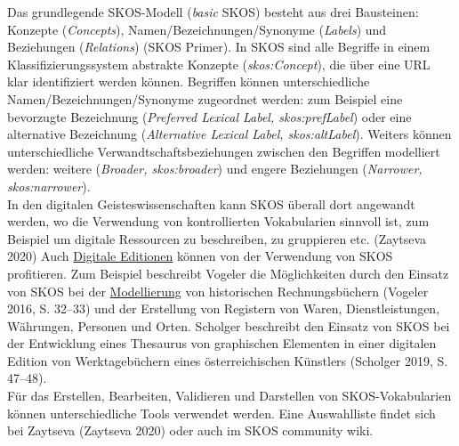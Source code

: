 \documentclass{article}
\begin{document}
        Das grundlegende SKOS-Modell (\emph{basic} SKOS) besteht aus drei
                  Bausteinen: Konzepte (\emph{Concepts}),
                  Namen/Bezeichnungen/Synonyme (\emph{Labels}) und Beziehungen (\emph{Relations}) (SKOS Primer). In SKOS sind alle
                  Begriffe in einem Klassifizierungssystem abstrakte Konzepte (\emph{skos:Concept}), die über eine URL klar identifiziert werden können.
                  Begriffen können unterschiedliche Namen/Bezeichnungen/Synonyme zugeordnet werden:
                  zum Beispiel eine bevorzugte Bezeichnung (\emph{Preferred Lexical
                     Label, skos:prefLabel}) oder eine alternative Bezeichnung (\emph{Alternative Lexical Label, skos:altLabel}). Weiters können
                  unterschiedliche Verwandtschaftsbeziehungen zwischen den Begriffen modelliert
                  werden: weitere (\emph{Broader, skos:broader}) und engere
                  Beziehungen (\emph{Narrower, skos:narrower}). \\
            
        In den digitalen Geisteswissenschaften kann SKOS überall dort angewandt werden, wo
                  die Verwendung von kontrollierten Vokabularien sinnvoll ist, zum Beispiel um
                  digitale Ressourcen zu beschreiben, zu gruppieren etc. (Zaytseva
                     2020) Auch \href{http://gams.uni-graz.at/o:konde.59}{Digitale
                     Editionen} können von der Verwendung von SKOS profitieren. Zum Beispiel
                  beschreibt Vogeler die Möglichkeiten durch den Einsatz von SKOS bei der \href{http://gams.uni-graz.at/o:konde.137}{Modellierung} von historischen
                  Rechnungsbüchern (Vogeler 2016, S. 32–33) und der Erstellung von
                  Registern von Waren, Dienstleistungen, Währungen, Personen und Orten. Scholger
                  beschreibt den Einsatz von SKOS bei der Entwicklung eines Thesaurus von
                  graphischen Elementen in einer digitalen Edition von Werktagebüchern eines
                  österreichischen Künstlers (Scholger 2019, S. 47–48). \\
            
        Für das Erstellen, Bearbeiten, Validieren und Darstellen von SKOS-Vokabularien
                  können unterschiedliche Tools verwendet werden. Eine Auswahlliste findet sich bei Zaytseva 
                  (Zaytseva 2020) oder auch im SKOS community wiki.\\
            
\end{document}
